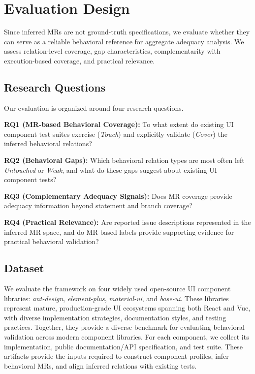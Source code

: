 \section{Evaluation Design}\label{sec:evaluation}
Since inferred MRs are not ground-truth specifications, we evaluate whether they can serve as a reliable behavioral reference for aggregate adequacy analysis. We assess relation-level coverage, gap characteristics, complementarity with execution-based coverage, and practical relevance.

\subsection{Research Questions}\label{sec:eva:rqs}
Our evaluation is organized around four research questions.

\textbf{RQ1 (MR-based Behavioral Coverage):} To what extent do existing UI component test suites exercise (\textit{Touch}) and explicitly validate (\textit{Cover}) the inferred behavioral relations?

\textbf{RQ2 (Behavioral Gaps):} Which behavioral relation types are most often left \textit{Untouched} or \textit{Weak}, and what do these gaps suggest about existing UI component tests?

\textbf{RQ3 (Complementary Adequacy Signals):} Does MR coverage provide adequacy information beyond statement and branch coverage?

\textbf{RQ4 (Practical Relevance):} Are reported issue descriptions represented in the inferred MR space, and do MR-based labels provide supporting evidence for practical behavioral validation?

\subsection{Dataset}\label{sec:dataset}
We evaluate the framework on four widely used open-source UI component libraries: \textit{ant-design}, \textit{element-plus}, \textit{material-ui}, and \textit{base-ui}. These libraries represent mature, production-grade UI ecosystems spanning both React and Vue, with diverse implementation strategies, documentation styles, and testing practices. Together, they provide a diverse benchmark for evaluating behavioral validation across modern component libraries. 
For each component, we collect its implementation, public documentation/API specification, and test suite. These artifacts provide the inputs required to construct component profiles, infer behavioral MRs, and align inferred relations with existing tests.

